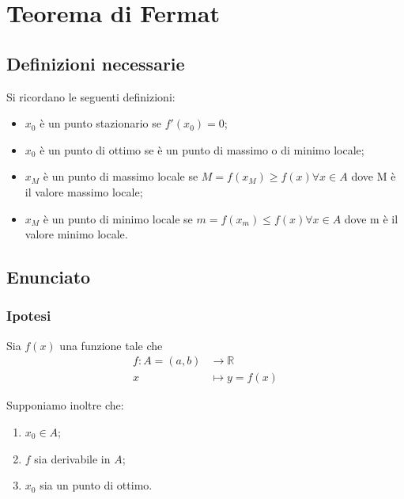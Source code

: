 \documentclass[../dimostrazioni]{subfiles}
\begin{document}
    \chapter{Teorema di Fermat}
    \label{teoFermat}

        \section*{Definizioni necessarie}

            Si ricordano le seguenti definizioni:

            \begin{itemize}
                \item \(x_0\) è un punto stazionario se \(f'(x_0) = 0\);
                \item \(x_0\) è un punto di ottimo se è un punto di massimo o di minimo locale;
                \item \(x_M\) è un punto di massimo locale se  \(M = f(x_M) \geqslant f(x) \forall  x \in A\) dove M è il valore massimo locale;
                \item \(x_M\) è un punto di minimo locale se  \(m = f(x_m) \leqslant f(x) \forall  x \in A\) dove m è il valore minimo locale.
            \end{itemize}

        \section*{Enunciato}

            \subsection*{Ipotesi}

                Sia \(f(x)\) una funzione tale che
                \begin{align*}
                    f : A = (a, b) &\longrightarrow \mathbb{R}\\
                    x &\longmapsto y = f(x) 
                \end{align*}

                Supponiamo inoltre che:

            \begin{enumerate}
                \indentitem \item \(x_0 \in A\);
                \indentitem \item \(f\) sia derivabile in \(A\);
                \indentitem \item \(x_0\) sia un punto di ottimo.
            \end{enumerate}
\end{document}
